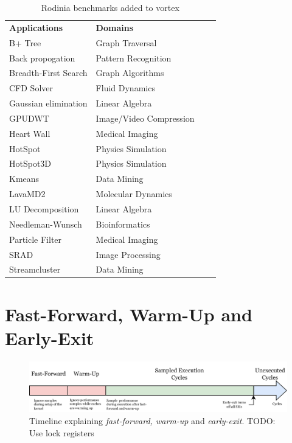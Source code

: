\begin{table}
    \centering
    \caption{Rodinia benchmarks added to \Gls{vortex}}
    \begin{tabular}{|l|l|l|l|} 
        \hline
        \textbf{Applications}      & \textbf{Domains} \\ \hhline{|=|=|}
        B+ Tree                    & Graph Traversal \\ \hline
        Back propogation           & Pattern Recognition \\ \hline
        Breadth-First Search       & Graph Algorithms  \\ \hline
        CFD Solver                 & Fluid Dynamics  \\ \hline
        Gaussian elimination       & Linear Algebra \\ \hline
        GPUDWT                     & Image/Video Compression  \\ \hline
        Heart Wall                 & Medical Imaging \\ \hline
        HotSpot                    & Physics Simulation  \\ \hline
        HotSpot3D                  & Physics Simulation  \\ \hline
        Kmeans                     & Data Mining \\ \hline
        LavaMD2                    & Molecular Dynamics\\ \hline
        LU Decomposition           & Linear Algebra  \\ \hline
        Needleman-Wunsch           & Bioinformatics\\ \hline
        Particle Filter            & Medical Imaging \\ \hline
        SRAD                       & Image Processing  \\ \hline
        Streamcluster              & Data Mining \\ \hline
    \end{tabular}
    \label{tab:new_benchmarks}
\end{table}

\section{Fast-Forward, Warm-Up and Early-Exit}

\begin{figure}
    \centering
    \includegraphics[width=\textwidth]{figures/fast-forward-timeline.png}
    \caption{Timeline explaining \textit{fast-forward, warm-up} and \textit{early-exit}. TODO: Use lock registers}
    \label{fig:ff-timeline}
\end{figure}

